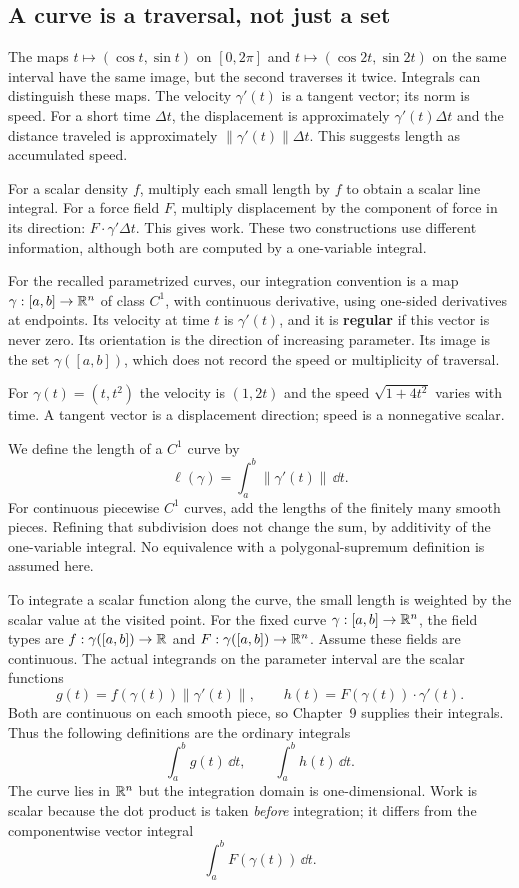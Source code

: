 \subsection{A curve is a traversal, not just a set}
The maps $t\mapsto(\cos t,\sin t)$ on $[0,2\pi]$ and
$t\mapsto(\cos2t,\sin2t)$ on the same interval have the same image,
but the second traverses it twice. Integrals can distinguish these maps.
The velocity $\gamma'(t)$ is a tangent vector; its norm is speed.
For a short time $\Delta t$, the displacement is approximately
$\gamma'(t)\Delta t$ and the distance traveled is approximately
$\|\gamma'(t)\|\Delta t$. This suggests length as accumulated speed.

For a scalar density $f$, multiply each small length by $f$ to obtain
a scalar line integral. For a force field $F$, multiply displacement by
the component of force in its direction: $F\cdot\gamma'\Delta t$.
This gives work. These two constructions use different information,
although both are computed by a one-variable integral.

\begin{definition}
For the recalled parametrized curves, our integration convention is a
map $\gamma:[a,b]\to\mathbb{R}^n$ of class $C^1$, with
continuous derivative, using one-sided derivatives at endpoints.
Its velocity at time $t$ is $\gamma'(t)$, and it is \textbf{regular}
if this vector is never zero. Its orientation is the direction of
increasing parameter. Its image is the set $\gamma([a,b])$, which
does not record the speed or multiplicity of traversal.
\end{definition}
For $\gamma(t)=(t,t^2)$ the velocity is $(1,2t)$ and the speed
$\sqrt{1+4t^2}$ varies with time. A tangent vector is a displacement
direction; speed is a nonnegative scalar.
\begin{definition}
We define the length of a $C^1$ curve by
\[
\ell(\gamma)=\int_a^b\|\gamma'(t)\|\,\dd t.
\]
For continuous piecewise $C^1$ curves, add the lengths of the finitely
many smooth pieces. Refining that subdivision does not change the sum,
by additivity of the one-variable integral. No equivalence with a
polygonal-supremum definition is assumed here.
\end{definition}
To integrate a scalar function along the curve, the small length is
weighted by the scalar value at the visited point.
For the fixed curve $\gamma:[a,b]\to\mathbb{R}^n$, the field types are
$f:\gamma([a,b])\to\mathbb{R}$ and $F:\gamma([a,b])\to\mathbb{R}^n$.
Assume these fields are continuous. The actual integrands on the parameter interval are the scalar functions
\[
g(t)=f(\gamma(t))\|\gamma'(t)\|,\qquad
h(t)=F(\gamma(t))\cdot\gamma'(t).
\]
Both are continuous on each smooth piece, so Chapter~9 supplies their
integrals. Thus the following definitions are the ordinary integrals
\[
\int_a^b g(t)\,\dd t,
\qquad
\int_a^b h(t)\,\dd t.
\]
The curve lies in $\mathbb{R}^n$ but the integration
domain is one-dimensional. Work is scalar because the dot product is taken
\emph{before} integration; it differs from the componentwise vector
integral
\[
\int_a^bF(\gamma(t))\,\dd t.
\]

